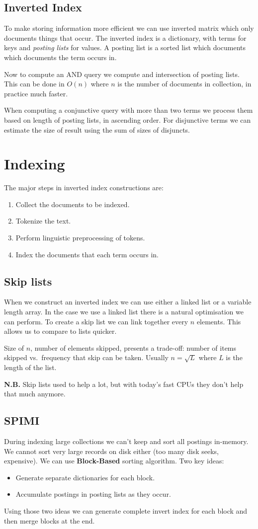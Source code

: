 \documentclass[a5paper]{report}
\newcommand\nb{\par\nobreak\smallskip\textbf{N.B. }}
\begin{document}
\subsection{Inverted Index}
To make storing information more efficient we can use inverted matrix which only documents things that occur.
The inverted index is a dictionary, with terms for keys and \emph{posting lists} for values.
A posting list is a sorted list which documents which documents the term occurs in.

Now to compute an AND query we compute and intersection of posting lists.
This can be done in $O(n)$ where $n$ is the number of documents in collection, in practice much faster.

When computing a conjunctive query with more than two terms we process them based on length of posting lists, in ascending order.
For disjunctive terms we can estimate the size of result using the sum of sizes of disjuncts.

\section{Indexing}
The major steps in inverted index constructions are:
\begin{enumerate}
\item Collect the documents to be indexed.
\item Tokenize the text.
\item Perform linguistic preprocessing of tokens.
\item Index the documents that each term occurs in.
\end{enumerate}
\subsection{Skip lists}
When we construct an inverted index we can use either a linked list or a variable length array.
In the case we use a linked list there is a natural optimisation we can perform.
To create a skip list we can link together every $n$ elements.
This allows us to compare to lists quicker.

Size of $n$, number of elements skipped, presents a trade-off: number of items skipped vs.\ frequency that skip can be taken.
Usually $n=\sqrt{L}$ where $L$ is the length of the list.
\nb Skip lists used to help a lot, but with today's fast CPUs they don't help that much anymore.
\subsection{SPIMI}
During indexing large collections we can't keep and sort all postings in-memory.
We cannot sort very large records on disk either (too many disk seeks, expensive).
We can use \textbf{Block-Based} sorting algorithm.
Two key ideas:
\begin{itemize}
\item Generate separate dictionaries for each block.
\item Accumulate postings in posting lists as they occur.
\end{itemize}
Using those two ideas we can generate complete invert index for each block and then merge blocks at the end.
\end{document}
